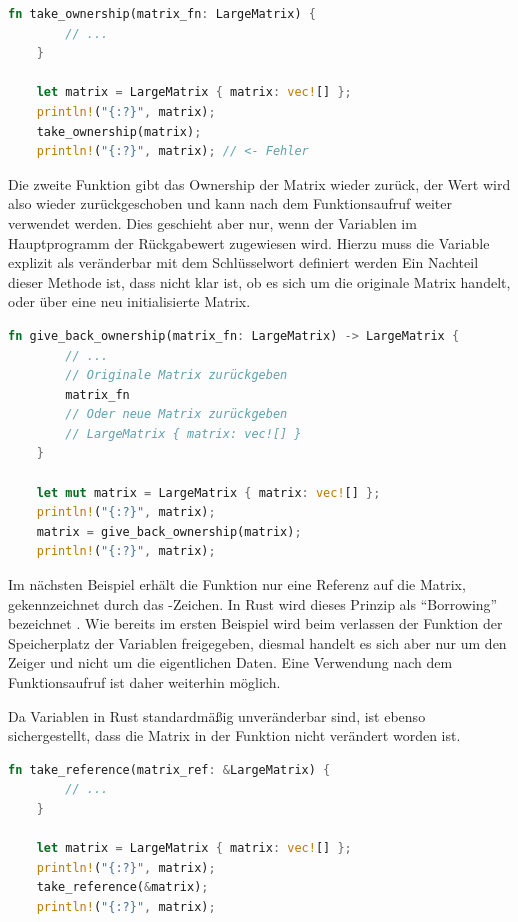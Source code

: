 \documentclass[11pt,a4paper, ngerman]{article}
\begin{document}
 \begin{lstlisting}[language=rust, caption={Einführendes Beispiel Ownership abgeben}]
    fn take_ownership(matrix_fn: LargeMatrix) {
        // ...
    }

    let matrix = LargeMatrix { matrix: vec![] };
    println!("{:?}", matrix);
    take_ownership(matrix);
    println!("{:?}", matrix); // <- Fehler
\end{lstlisting}

Die zweite Funktion gibt das Ownership der Matrix wieder zurück, der Wert wird also wieder zurückgeschoben und kann nach dem Funktionsaufruf weiter verwendet werden. Dies geschieht aber nur, wenn der Variablen im Hauptprogramm der Rückgabewert zugewiesen wird. Hierzu muss die Variable  explizit als veränderbar mit dem Schlüsselwort  definiert werden Ein Nachteil dieser Methode ist, dass nicht klar ist, ob es sich um die originale Matrix handelt, oder über eine neu initialisierte Matrix.

\begin{lstlisting}[language=rust, caption={Einführendes Beispiel Ownership zurückgeben}]
    fn give_back_ownership(matrix_fn: LargeMatrix) -> LargeMatrix {
        // ...
        // Originale Matrix zurückgeben
        matrix_fn
        // Oder neue Matrix zurückgeben
        // LargeMatrix { matrix: vec![] }
    }

    let mut matrix = LargeMatrix { matrix: vec![] };
    println!("{:?}", matrix);
    matrix = give_back_ownership(matrix);
    println!("{:?}", matrix);
\end{lstlisting}

Im nächsten Beispiel erhält die Funktion nur eine Referenz auf die Matrix, gekennzeichnet durch das \codeword{&}-Zeichen. In Rust wird dieses Prinzip als ``Borrowing'' bezeichnet \cite{RustBorrowing}. Wie bereits im ersten Beispiel wird beim verlassen der Funktion der Speicherplatz der Variablen freigegeben, diesmal handelt es sich aber nur um den Zeiger und nicht um die eigentlichen Daten. Eine Verwendung nach dem Funktionsaufruf ist daher weiterhin möglich.

Da Variablen in Rust standardmäßig unveränderbar sind, ist ebenso sichergestellt, dass die Matrix in der Funktion nicht verändert worden ist. 

\begin{lstlisting}[language=rust, caption={Einführendes Beispiel Unveränderliche Referenz}]
    fn take_reference(matrix_ref: &LargeMatrix) {
        // ...
    }

    let matrix = LargeMatrix { matrix: vec![] };
    println!("{:?}", matrix);
    take_reference(&matrix);
    println!("{:?}", matrix);
\end{lstlisting}
\end{document}
